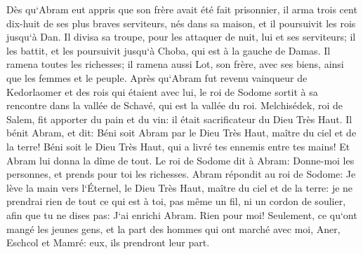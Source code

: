 \verse Dès qu`Abram eut appris que son frère avait été fait prisonnier, il arma trois cent dix-huit de ses plus braves serviteurs, nés dans sa maison, et il poursuivit les rois jusqu`à Dan. 
\verse Il divisa sa troupe, pour les attaquer de nuit, lui et ses serviteurs; il les battit, et les poursuivit jusqu`à Choba, qui est à la gauche de Damas. 
\verse Il ramena toutes les richesses; il ramena aussi Lot, son frère, avec ses biens, ainsi que les femmes et le peuple. 
\verse Après qu`Abram fut revenu vainqueur de Kedorlaomer et des rois qui étaient avec lui, le roi de Sodome sortit à sa rencontre dans la vallée de Schavé, qui est la vallée du roi. 
\verse Melchisédek, roi de Salem, fit apporter du pain et du vin: il était sacrificateur du Dieu Très Haut. 
\verse Il bénit Abram, et dit: Béni soit Abram par le Dieu Très Haut, maître du ciel et de la terre! 
\verse Béni soit le Dieu Très Haut, qui a livré tes ennemis entre tes mains! Et Abram lui donna la dîme de tout. 
\verse Le roi de Sodome dit à Abram: Donne-moi les personnes, et prends pour toi les richesses. 
\verse Abram répondit au roi de Sodome: Je lève la main vers l`Éternel, le Dieu Très Haut, maître du ciel et de la terre: 
\verse je ne prendrai rien de tout ce qui est à toi, pas même un fil, ni un cordon de soulier, afin que tu ne dises pas: J`ai enrichi Abram. Rien pour moi! 
\verse Seulement, ce qu`ont mangé les jeunes gens, et la part des hommes qui ont marché avec moi, Aner, Eschcol et Mamré: eux, ils prendront leur part. 

